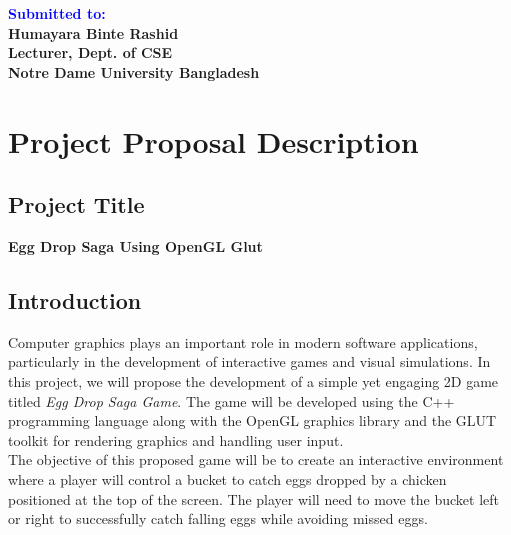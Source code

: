 \documentclass[12pt]{article}
\begin{document}
\begin{titlepage}
\begin{center}
    \vfill
    \begin{flushleft}
        \textbf{\Huge \textcolor{blue}{Submitted to:}} \\
        \vspace{0.3cm}
        \textbf{\Large Humayara Binte Rashid} \\
        \vspace{0.3cm}
        \textbf{\Large Lecturer, Dept. of CSE} \\
        \vspace{0.3cm}
        \textbf{\Large Notre Dame University Bangladesh}
    \end{flushleft}

\end{center}
\end{titlepage}


\rfoot{\thepage}
\tableofcontents
\thispagestyle{empty}
\clearpage

\pagestyle{fancy}
\fancyhf{}


\section{Project Proposal Description}

\subsection{Project Title}
\centering
\textbf{Egg Drop Saga Using OpenGL Glut}


\subsection{Introduction}

Computer graphics plays an important role in modern software applications, particularly in the development of interactive games and visual simulations. In this project, we will propose the development of a simple yet engaging 2D game titled \textit{Egg Drop Saga Game}. The game will be developed using the C++ programming language along with the OpenGL graphics library and the GLUT toolkit for rendering graphics and handling user input.\\
The objective of this proposed game will be to create an interactive environment where a player will control a bucket to catch eggs dropped by a chicken positioned at the top of the screen. The player will need to move the bucket left or right to successfully catch falling eggs while avoiding missed eggs.
\end{document}
